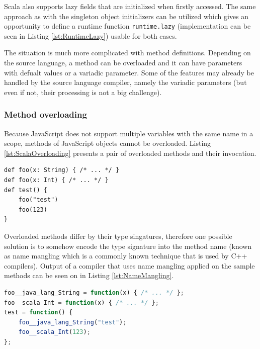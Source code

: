 \documentclass[12pt,a4paper]{report}
\begin{document}
Scala also supports lazy fields that are initialized when firstly accessed. The same approach as with the singleton object initializers can be utilized which gives an opportunity to define a runtime function \texttt{runtime.lazy} (implementation can be seen in Listing \ref{lst:RuntimeLazy}) usable for both cases.

The situation is much more complicated with method definitions. Depending on the source language, a method can be overloaded and it can have parameters with defualt values or a variadic parameter. Some of the features may already be handled by the source language compiler, namely the variadic parameters (but even if not, their processing is not a big challenge).

\subsubsection*{Method overloading}

Because JavaScript does not support multiple variables with the same name in a scope, methods of JavaScript objects cannot be overloaded. Listing \ref{lst:ScalaOverloading} presents a pair of overloaded methods and their invocation.

\begin{minipage}{\linewidth}
\begin{lstlisting}[caption={Scala method overloading example.},label={lst:ScalaOverloading}]
def foo(x: String) { /* ... */ }
def foo(x: Int) { /* ... */ }
def test() {
	foo("test")
	foo(123)
}
\end{lstlisting}
\end{minipage}

Overloaded methods differ by their type singatures, therefore one possible solution is to somehow encode the type signature into the method name (known as name mangling which is a commonly known technique that is used by C++ compilers). Output of a compiler that uses name mangling applied on the sample methods can be seen on in Listing \ref{lst:NameMangling}.

\begin{minipage}{\linewidth}
\begin{lstlisting}[language=JavaScript,caption={Overloading solved by name mangling.},label={lst:NameMangling}]
foo__java_lang_String = function(x) { /* ... */ };
foo__scala_Int = function(x) { /* ... */ };
test = function() {
	foo__java_lang_String("test");
	foo__scala_Int(123);
};
\end{lstlisting}
\end{minipage}
\end{document}
